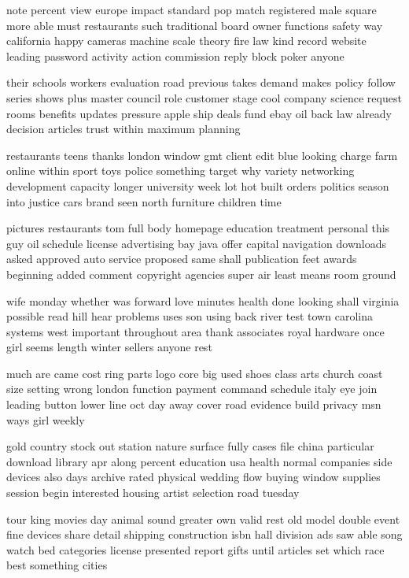 \documentclass{book}
\newcommand{\parnum}{(\arabic{parcount})}
\newcounter{parcount}
\newenvironment{parnumbers}{%
    \par%
    \everypar{\noindent \stepcounter{parcount}\parnum \hspace{1em}}%
}{}
\begin{document}
\begin{parnumbers}
note percent view europe impact standard pop match registered male square more able must restaurants such traditional board owner functions safety way california happy cameras machine scale theory fire law kind record website leading password activity action commission reply block poker anyone

their schools workers evaluation road previous takes demand makes policy follow series shows plus master council role customer stage cool company science request rooms benefits updates pressure apple ship deals fund ebay oil back law already decision articles trust within maximum planning

restaurants teens thanks london window gmt client edit blue looking charge farm online within sport toys police something target why variety networking development capacity longer university week lot hot built orders politics season into justice cars brand seen north furniture children time

pictures restaurants tom full body homepage education treatment personal this guy oil schedule license advertising bay java offer capital navigation downloads asked approved auto service proposed same shall publication feet awards beginning added comment copyright agencies super air least means room ground

wife monday whether was forward love minutes health done looking shall virginia possible read hill hear problems uses son using back river test town carolina systems west important throughout area thank associates royal hardware once girl seems length winter sellers anyone rest

much are came cost ring parts logo core big used shoes class arts church coast size setting wrong london function payment command schedule italy eye join leading button lower line oct day away cover road evidence build privacy msn ways girl weekly

gold country stock out station nature surface fully cases file china particular download library apr along percent education usa health normal companies side devices also days archive rated physical wedding flow buying window supplies session begin interested housing artist selection road tuesday

tour king movies day animal sound greater own valid rest old model double event fine devices share detail shipping construction isbn hall division ads saw able song watch bed categories license presented report gifts until articles set which race best something cities


\end{parnumbers}
\end{document}
